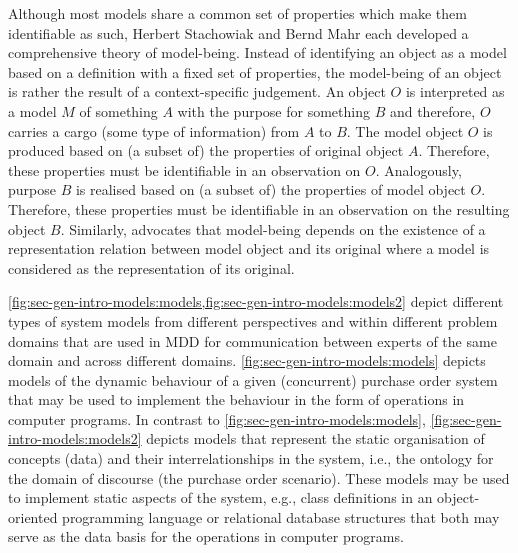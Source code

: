 Although most models share a common set of properties which make them identifiable as such, Herbert Stachowiak \cite{Stachowiak.1973} and Bernd Mahr \cite{DBLP:journals/sosym/Mahr09,DBLP:journals/eceasst/Mahr10a} each developed a comprehensive theory of model-being.
Instead of identifying an object as a model based on a definition with a fixed set of properties, the model-being of an object is rather the result of a context-specific judgement.
An object $O$ is interpreted as a model $M$ of something $A$ with the purpose for something $B$ and therefore, $O$ carries a cargo (some type of information) from $A$ to $B$.
The model object $O$ is produced based on (a subset of) the properties of original object $A$.
Therefore, these properties must be identifiable in an observation on $O$.
Analogously, purpose $B$ is realised based on (a subset of) the properties of model object $O$.
Therefore, these properties must be identifiable in an observation on the resulting object $B$.
Similarly, \cite{Muller2012} advocates that model-being depends on the existence of a representation relation between model object and its original where a model is considered as the representation of its original.

\cref{fig:sec-gen-intro-models:models,fig:sec-gen-intro-models:models2} depict different types of system models from different perspectives and within different problem domains that are used in MDD \cite{6507223,mdd05,Beydeda2005ModelDriven} for communication between experts of the same domain and across different domains.
\cref{fig:sec-gen-intro-models:models} depicts models of the dynamic behaviour of a given (concurrent) purchase order system that may be used to implement the behaviour in the form of operations in computer programs.
In contrast to \cref{fig:sec-gen-intro-models:models}, \cref{fig:sec-gen-intro-models:models2} depicts models that represent the static organisation of concepts (data) and their interrelationships in the system, i.e., the ontology for the domain of discourse (the purchase order scenario).
These models may be used to implement static aspects of the system, e.g., class definitions in an object-oriented programming language or relational database structures that both may serve as the data basis for the operations in computer programs.

